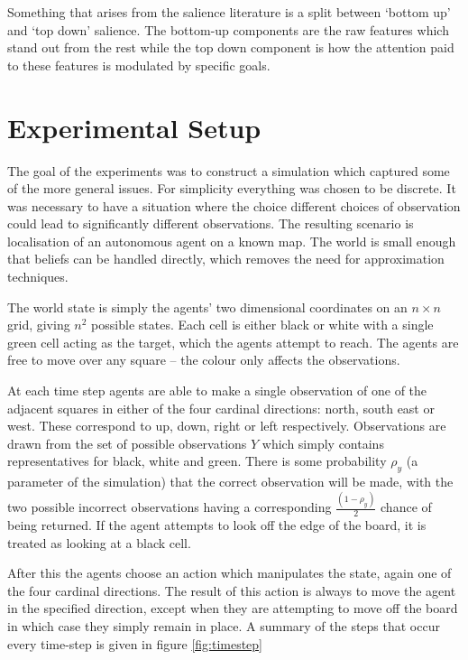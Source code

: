 \documentclass{article}
\begin{document}
Something that arises from the salience literature is a split between `bottom up' and 
`top down' salience. The bottom-up components are the raw features which stand out
from the rest while the top down component is how the attention paid to these features 
is modulated by specific goals. \autocite{wolfe1994guided}

\section{Experimental Setup}
The goal of the experiments was to construct a simulation which captured some of the more
general issues. For simplicity everything was chosen to be discrete. It was necessary to
have a situation where the choice different choices of observation could lead to 
significantly different observations. The resulting scenario is localisation of an
autonomous agent on a known map. The world is small enough that beliefs can be handled
directly, which removes the need for approximation techniques.

The world state is simply the agents' two dimensional coordinates on an \(n \times n\)
grid, giving
\(n^2\) possible states. Each cell is either black or white with a single green
cell acting as the target, which the agents attempt to reach. The agents are free to 
move over any square -- the colour only affects the observations. 

At each time step agents are able to make a single observation of one of the adjacent
squares in either of the four cardinal directions: north, south east or west. These 
correspond to up, down, right or left respectively. Observations are drawn from the 
set of possible observations \(Y\) which simply contains representatives for black, 
white and green. There is some probability \(\rho_y\) (a parameter of the
simulation) that the correct observation will be made, with the two possible incorrect
observations having a corresponding \(\frac{(1-\rho_y)}{2}\) chance of being returned.
If the agent attempts to look off the edge of the board, it is treated as looking at a 
black cell.

After this the agents choose an action which manipulates the state, again one of the 
four cardinal directions. The result of this action is always to move the agent in the 
specified direction, except when they are attempting to move off the board in which case 
they simply remain in place. A summary of the steps that occur every time-step is 
given in figure \ref{fig:timestep}
\end{document}
